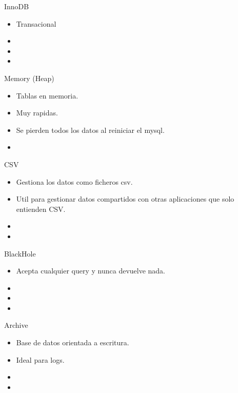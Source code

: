 \begin{frame}{InnoDB}
  \begin{itemize}
    \item Transacional
    \item 
    \item 
    \item 
  \end{itemize}
\end{frame}

\begin{frame}{Memory (Heap)}
  \begin{itemize}
    \item Tablas en memoria.
    \item Muy rapidas.
    \item Se pierden todos los datos al reiniciar el mysql.
    \item 
  \end{itemize}
\end{frame}

\begin{frame}{CSV}
  \begin{itemize}
    \item Gestiona los datos como ficheros csv.
    \item Util para gestionar datos compartidos con otras aplicaciones que solo entienden CSV.
    \item 
    \item 
  \end{itemize}
\end{frame}

\begin{frame}{BlackHole}
  \begin{itemize}
    \item Acepta cualquier query y nunca devuelve nada.
    \item 
    \item 
    \item 
  \end{itemize}
\end{frame}

\begin{frame}{Archive}
  \begin{itemize}
    \item Base de datos orientada a escritura.
    \item Ideal para logs.
    \item 
    \item 
  \end{itemize}
\end{frame}

